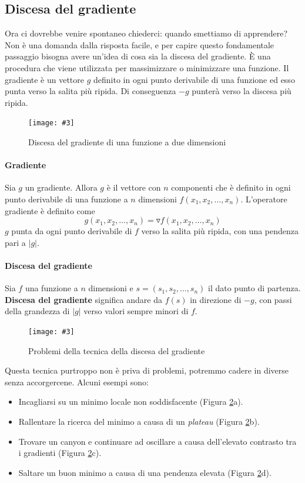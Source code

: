 \documentclass[12pt, twoside, letterpaper]{report}
\newcommand{\img}[4] {
	\begin{figure}
		\centering
		\texttt{[image: \#3]}\\
		\caption{#1}
		\label{#4}
	\end{figure}
}
\begin{document}
			
			\subsection{Discesa del gradiente}
				Ora ci dovrebbe venire spontaneo chiederci: quando smettiamo di apprendere? Non è una domanda dalla risposta facile, e per capire questo fondamentale passaggio bisogna avere un'idea di cosa sia la discesa del gradiente. È una procedura che viene utilizzata per massimizzare o minimizzare una funzione. Il gradiente è un vettore $g$ definito in ogni punto derivabile di una funzione ed esso punta verso la salita più ripida. Di conseguenza $-g$ punterà verso la discesa più ripida.
				\img{Discesa del gradiente di una funzione a due dimensioni}{0.5}{gradient_descent_2d.png}{gradient_descent}

				\paragraph{Gradiente} Sia $g$ un gradiente. Allora $g$ è il vettore con $n$ componenti che è definito in ogni punto derivabile di una funzione a $n$ dimensioni $f(x_1, x_2, \dots, x_n)$. L'operatore gradiente è definito come $$g(x_1, x_2, \dots, x_n) = \triangledown f(x_1, x_2, \dots, x_n)$$
					$g$ punta da ogni punto derivabile di $f$ verso la salita più ripida, con una pendenza pari a $|g|$. \cite{kriesel}
				
				\paragraph{Discesa del gradiente} Sia $f$ una funzione a $n$ dimensioni e $s=(s_1, s_2, \dots, s_n)$ il dato punto di partenza. \textbf{Discesa del gradiente} significa andare da $f(s)$ in direzione di $-g$, con passi della grandezza di $|g|$ verso valori sempre minori di $f$. \cite{kriesel}
				
				\img{Problemi della tecnica della discesa del gradiente}{0.4}{gradient_descent.png}{gradient_descent}
				
				Questa tecnica purtroppo non è priva di problemi, potremmo cadere in diverse  senza accorgercene. Alcuni esempi sono: 
				\begin{itemize}
				 	\item Incagliarsi su un minimo locale non soddisfacente (Figura \ref{gradient_descent}a).
				 	\item Rallentare la ricerca del minimo a causa di un \textit{plateau} (Figura \ref{gradient_descent}b).
				 	\item Trovare un canyon  e continuare ad oscillare a causa dell'elevato contrasto tra i gradienti (Figura \ref{gradient_descent}c).
				 	\item Saltare un buon minimo a causa di una pendenza elevata (Figura \ref{gradient_descent}d).
				 \end{itemize} 
				 
\end{document}
